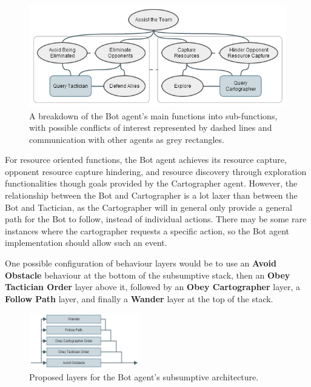 \documentclass[a4paper,10pt]{article}
\begin{document}
\begin{figure}[!ht]
  \centering
  \includegraphics[width=0.8\linewidth]{bot}
  \begin{minipage}[t]{0.8\textwidth}
    \caption{A breakdown of the Bot agent's main functions into sub-functions, with possible conflicts of interest represented by dashed lines and communication with other agents as grey rectangles.}
  \end{minipage}
\end{figure}

For resource oriented functions, the Bot agent achieves its resource capture, opponent resource capture hindering, and resource discovery through exploration functionalities though goals provided by the Cartographer agent. However, the relationship between the Bot and Cartographer is a lot laxer than between the Bot and Tactician, as the Cartographer will in general only provide a general path for the Bot to follow, instead of individual actions. There may be some rare instances where the cartographer requests a specific action, so the Bot agent implementation should allow such an event.

One possible configuration of behaviour layers would be to use an \textbf{Avoid Obstacle} behaviour at the bottom of the subsumptive stack, then an \textbf{Obey Tactician Order} layer above it, followed by an \textbf{Obey Cartographer} layer, a \textbf{Follow Path} layer, and finally a \textbf{Wander} layer at the top of the stack.

\begin{figure}
  \vspace{-5mm}
  \begin{center}
    \includegraphics[width=0.43\textwidth]{subsumptive}
    \caption{Proposed layers for the Bot agent's subsumptive architecture.}
  \end{center}
  \vspace{-5mm}
\end{figure}
\end{document}
